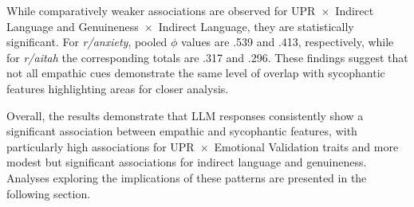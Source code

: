\noindent
While comparatively weaker associations are observed for UPR~$\times$~Indirect Language and Genuineness~$\times$~Indirect Language, they are statistically significant. For \textit{r/anxiety}, pooled $\phi$ values are .539 and .413, respectively, while for \textit{r/aitah} the corresponding totals are .317 and .296. These findings suggest that not all empathic cues demonstrate the same level of overlap with sycophantic features highlighting areas for closer analysis.

\medskip

\noindent
Overall, the results demonstrate that LLM responses consistently show a significant association between empathic and sycophantic features, with particularly high associations for UPR~$\times$~Emotional Validation traits and more modest but significant associations for indirect language and genuineness. Analyses exploring the implications of these patterns are presented in the following section.

\renewcommand{\arraystretch}{1.4}

\begin{table}[h!]
\centering
{}
\caption{\textbf{r/anxiety LLM response evaluation on \\ Empathy (PCT) and Sycophancy (ToF) metrics}}
\label{tab:pc1}
\end{table}

